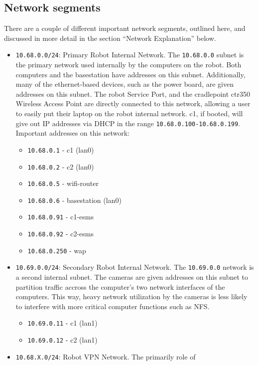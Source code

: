 \subsection{Network segments}
There are a couple of different important network segments, outlined
here, and discussed in more detail in the section ``Network
Explanation'' below.
\begin{itemize}
\item \texttt{10.68.0.0/24}: Primary Robot Internal Network. The
  \texttt{10.68.0.0} subnet is the primary network used internally by
  the computers on the robot.  Both computers and the basestation have
  addresses on this subnet.  Additionally, many of the ethernet-based
  devices, such as the power board, are given addresses on this
  subnet.  The robot Service Port, and the cradlepoint ctr350 Wireless
  Access Point are directly connected to this network, allowing a user
  to easily put their laptop on the robot internal network.  c1, if
  booted, will give out IP addresses via DHCP in the range
  \texttt{10.68.0.100-10.68.0.199}.  Important addresses on this
  network:
  \begin{itemize}
  \item \texttt{10.68.0.1} - c1 (lan0)
  \item \texttt{10.68.0.2} - c2 (lan0)
  \item \texttt{10.68.0.5} - wifi-router
  \item \texttt{10.68.0.6} - basestation (lan0)
  \item \texttt{10.68.0.91} - c1-esms
  \item \texttt{10.68.0.92} - c2-esms
  \item \texttt{10.68.0.250} - wap
  \end{itemize}
\item \texttt{10.69.0.0/24}: Secondary Robot Internal Network.  The
  \texttt{10.69.0.0} network is a second internal subnet.  The cameras
  are given addresses on this subnet to partition traffic accross the
  computer's two network interfaces of the computers. This way, heavy
  network utilization by the cameras is less likely to interfere with
  more critical computer functions such as NFS.
  \begin{itemize}
  \item \texttt{10.69.0.11} - c1 (lan1)
  \item \texttt{10.69.0.12} - c2 (lan1)
  \end{itemize}
\item \texttt{10.68.X.0/24}: Robot VPN Network. The primarily role of

\end{itemize}
